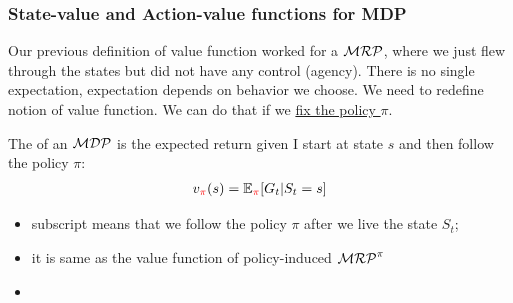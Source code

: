 
\subsubsection{State-value and Action-value functions for MDP}
Our previous definition of value function worked for a $\mathcal{MRP}$, where we just flew through the states but did not have any control (agency). There is no single expectation, expectation depends on behavior we choose. We need to redefine notion of value function. We can do that if we \underline{fix the policy $\pi$}.

The  of an $\mathcal{MDP}$ is the expected return given I start at state $s$ and then follow the policy $\pi$:
\begin{align}
	v_{\textcolor{red}{\pi}}(s) = \operatorname{\mathbb{E}}_{\textcolor{red}{\pi}}[G_t | S_t = s]
\end{align}
\begin{itemize}
	\item subscript \red{$\pi$} means that we follow the policy $\pi$ after we live the state $S_t$;
	\item it is same as the value function of policy-induced $\mathcal{MRP}^{\pi}$
	\item {}
\end{itemize}

